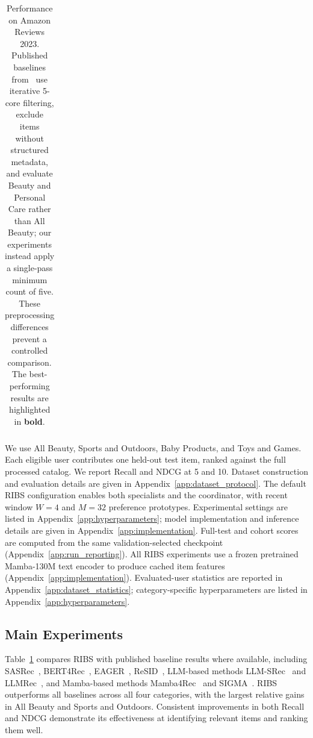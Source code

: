 ﻿\documentclass[sigconf,anonymous,review]{acmart}
\begin{document}
\begin{table}[!tbp]
{\begin{tabular}{l*{4}{rrrr}}
        \bottomrule
    \end{tabular}%
    }
    \caption{Performance on Amazon Reviews 2023. Published baselines from~\citet{RESID} use iterative 5-core filtering, exclude items without structured metadata, and evaluate Beauty and Personal Care rather than All Beauty; our experiments instead apply a single-pass minimum count of five. These preprocessing differences prevent a controlled comparison. The best-performing results are highlighted in \textbf{bold}.}
    \label{tab:overall_main}
    \vspace{-0.3cm}
\end{table}

\label{sec:experimental_setup}

We use All Beauty, Sports and Outdoors, Baby Products, and Toys and Games. Each eligible user contributes one held-out test item, ranked against the full processed catalog. We report Recall and NDCG at 5 and 10. Dataset construction and evaluation details are given in Appendix~\ref{app:dataset_protocol}.
The default RIBS configuration enables both specialists and the coordinator, with recent window $W=4$ and $M=32$ preference prototypes. Experimental settings are listed in Appendix~\ref{app:hyperparameters}; model implementation and inference details are given in Appendix~\ref{app:implementation}. Full-test and cohort scores are computed from the same validation-selected checkpoint (Appendix~\ref{app:run_reporting}). All RIBS experiments use a frozen pretrained Mamba-130M text encoder to produce cached item features (Appendix~\ref{app:implementation}). 
Evaluated-user statistics are reported in Appendix~\ref{app:dataset_statistics}; category-specific hyperparameters are listed in Appendix~\ref{app:hyperparameters}.

\subsection{Main Experiments}

\label{sec:overall_results}



Table~\ref{tab:overall_main} compares RIBS with published baseline results where available, including SASRec~\citep{SASRec}, BERT4Rec~\citep{BERT4Rec}, EAGER~\citep{EAGER}, ReSID~\citep{RESID}, LLM-based methods LLM-SRec~\citep{LLM-SRec} and LLMRec~\citep{LLMRec}, and Mamba-based methods Mamba4Rec~\citep{Mamba4Rec} and SIGMA~\citep{SIGMA}. RIBS outperforms all baselines across all four categories, with the largest relative gains in All Beauty and Sports and Outdoors. Consistent improvements in both Recall and NDCG demonstrate its effectiveness at identifying relevant items and ranking them well.
\end{document}
